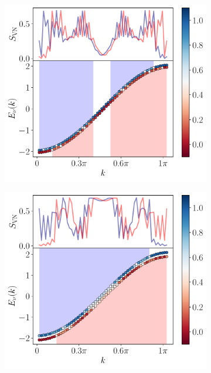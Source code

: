 \documentclass{article}
\begin{document}
\begin{figure}[h]
    \centering
    \begin{subfigure}[b]{0.43\textwidth}
        \includegraphics[width=\textwidth]{figures/report_08_2025/exact_energies_Lqpc=60_Omega=0.4_t=0.05.pdf}
        \caption{}
    \end{subfigure}
    \hspace{0.001\textwidth}
    \begin{subfigure}[b]{0.43\textwidth}
        \includegraphics[width=\textwidth]{figures/report_08_2025/exact_energies_Lqpc=60_Omega=0.4_t=0.1.pdf}

\end{subfigure}
\end{figure}
\end{document}
